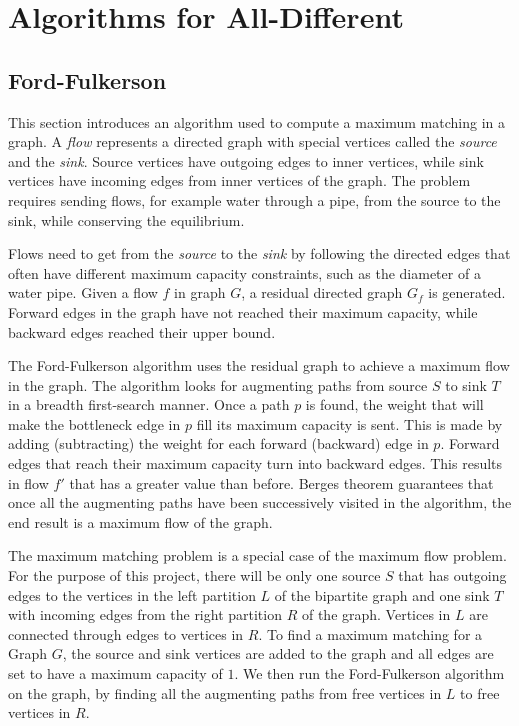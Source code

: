 \documentclass{l4proj}
\begin{document}
\chapter{Algorithms for All-Different}
\label{chap4alldiffalgos}

\section{Ford-Fulkerson}
\label{ffsection}
\noindent This section introduces an algorithm used to compute a maximum matching in a graph. A \textit{flow} represents a directed graph with special vertices called the \textit{source} and the \textit{sink}. Source vertices have outgoing edges to inner vertices, while sink vertices have incoming edges from inner vertices of the graph. The problem requires sending flows, for example water through a pipe, from the source to the sink, while conserving the equilibrium.

\noindent Flows need to get from the \textit{source} to the \textit{sink} by following the directed edges that often have different maximum capacity constraints, such as the diameter of a water pipe. Given a flow $f$ in graph $G$, a residual directed graph $G_f$ is generated. Forward edges in the graph have not reached their maximum capacity, while backward edges reached their upper bound. 

\noindent The Ford-Fulkerson algorithm  \cite{ford1956maximal} uses the residual graph to achieve a maximum flow in the graph. The algorithm looks for augmenting paths from source $S$ to sink $T$ in a breadth first-search manner. Once a path $p$ is found, the weight that will make the bottleneck edge in $p$ fill its maximum capacity is sent. This is made by adding (subtracting) the weight for each forward (backward) edge in $p$. Forward edges that reach their maximum capacity turn into backward edges. This results in flow $f'$ that has a greater value than before. Berge\textquotesingle s theorem \cite{berge1957two} guarantees that once all the augmenting paths have been successively visited in the algorithm, the end result is a maximum flow of the graph.

\noindent The maximum matching problem is a special case of the maximum flow problem. For the purpose of this project, there will be only one source $S$ that has outgoing edges to the vertices in the left partition $L$ of the bipartite graph and one sink $T$ with incoming edges from the right partition $R$ of the graph. Vertices in $L$ are connected through edges to vertices in $R$. To find a maximum matching for a Graph $G$, the source and sink vertices are added to the graph and all edges are set to have a maximum capacity of $1$. We then run the Ford-Fulkerson algorithm \cite{ford1956maximal} on the graph, by finding all the augmenting paths from free vertices in $L$ to free vertices in $R$.
\end{document}
